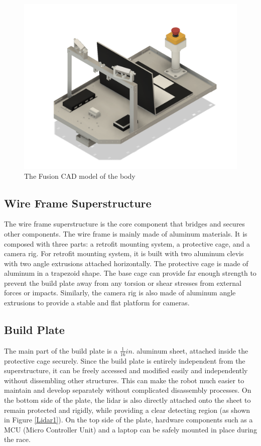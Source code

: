 \documentclass[11pt,journal]{IEEEtran}
\begin{document}
\begin{figure}[h]
\centerline{\includegraphics[width=0.9\columnwidth]{2018DesignMech.png}}
\caption{The Fusion CAD model of the body}
\label{Body1}
\end{figure}

\subsection{Wire Frame Superstructure}
The wire frame superstructure is the core component that bridges and secures other components. The wire frame is mainly made of aluminum materials. It is composed with three parts: a retrofit mounting system, a protective cage, and a camera rig. For retrofit mounting system, it is built with two aluminum clevis with two angle extrusions attached horizontally. The protective cage is made of aluminum in a trapezoid shape. The base cage can provide far enough strength to prevent the build plate away from any torsion or shear stresses from external forces or impacts. Similarly, the camera rig is also made of aluminum angle extrusions to provide a stable and flat platform for cameras. 

\subsection{Build Plate}
The main part of the build plate is a $\frac{1}{16} in.$ aluminum sheet, attached inside the protective cage securely. Since the build plate is entirely independent from the superstructure, it can be freely accessed and modified easily and independently without dissembling other structures. This can make the robot much easier to maintain and develop separately without complicated disassembly processes. On the bottom side of the plate, the lidar is also directly attached onto the sheet to remain protected and rigidly, while providing a clear detecting region (as shown in Figure \ref{Lidar1}). On the top side of the plate, hardware components such as a MCU (Micro Controller Unit) and a laptop can be safely mounted in place during the race.
\end{document}
